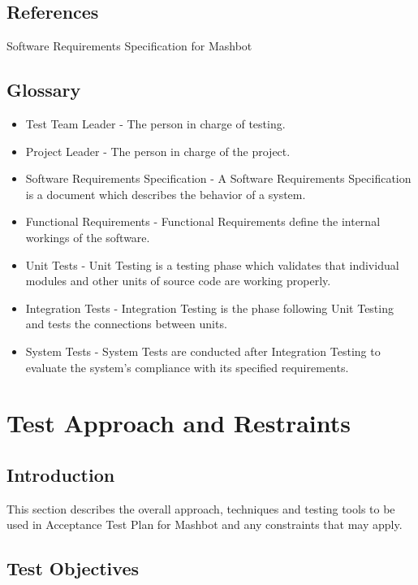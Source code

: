 \documentclass{article}
\begin{document}
\subsection{References}
Software Requirements Specification for Mashbot

\subsection{Glossary}

\begin{itemize}
\item Test Team Leader - The person in charge of testing.
\item Project Leader - The person in charge of the project.
\item Software Requirements Specification - A Software Requirements Specification is a document which
  describes the behavior of a system.
\item Functional Requirements - Functional Requirements define the internal workings of the software.
\item Unit Tests - Unit Testing is a testing phase which validates
  that individual modules and other units of source code are working
  properly.
\item Integration Tests - Integration Testing is the phase following
  Unit Testing and tests the connections between units.
\item System Tests - System Tests are conducted after Integration
  Testing to evaluate the system’s compliance with its specified
  requirements.
\end{itemize}

\section{Test Approach and Restraints} %

\subsection{Introduction}

This section describes the overall approach, techniques and
testing tools to be used in Acceptance Test Plan for Mashbot and any constraints that may apply.

\subsection{Test Objectives}
\end{document}
